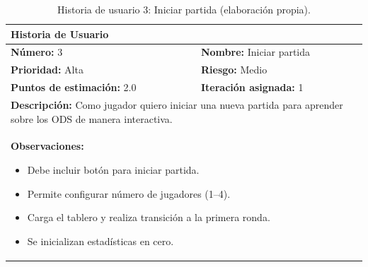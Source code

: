 \begin{table}[H]
\centering
\caption{Historia de usuario 3: Iniciar partida (elaboración propia).\label{tab:hu3}}
\renewcommand{\arraystretch}{1.5}
\begin{tabular}{|p{}|p{}|}
\hline
\multicolumn{2}{|l|}{\textbf{Historia de Usuario}} \\
\hline
\textbf{Número:} 3 & \textbf{Nombre:} Iniciar partida \\
\hline
\textbf{Prioridad:} Alta & \textbf{Riesgo:} Medio \\
\hline
\textbf{Puntos de estimación:} 2.0 & \textbf{Iteración asignada:} 1 \\
\hline
\multicolumn{2}{|p{0.945\textwidth}|}{\textbf{Descripción:} Como jugador quiero iniciar una nueva partida para aprender sobre los ODS de manera interactiva.} \\
\hline
\multicolumn{2}{|p{0.945\textwidth}|}{\textbf{Observaciones:}
\vspace{-0.5em}
\begin{itemize}
    \setlength\itemsep{0em}
    \item Debe incluir botón para iniciar partida.
    \item Permite configurar número de jugadores (1--4).
    \item Carga el tablero y realiza transición a la primera ronda.
    \item Se inicializan estadísticas en cero.
\end{itemize}
\vspace{-1em}
} \\
\hline
\end{tabular}
\end{table}

